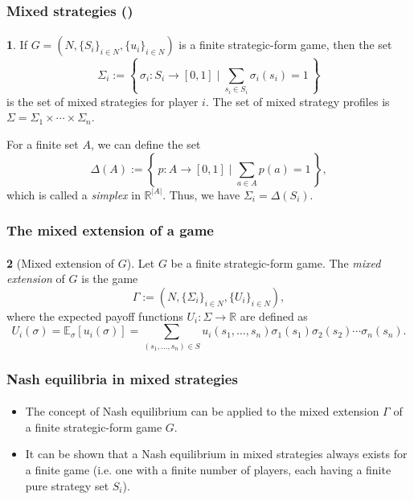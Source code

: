 \documentclass[10pt]{beamer}
\theoremstyle{definition}
\newtheorem{definition}{\translate{Definition}}
\begin{document}
\begin{frame}[fragile]
\frametitle{Mixed strategies ()}
\framesubtitle{}
\begin{definition}
If $ G = (N,\{S_i\}_{i \in N}, \{u_i\}_{i \in N}) $ is a finite strategic-form game, then the set \begin{equation}
\Sigma_i := \left\{\, \sigma_i: S_i \rightarrow [0,1] \mid \sum_{s_i \in S_i}\sigma_i(s_i) = 1  \,\right\}
\label{eq:MixedStrSet}
\end{equation}
is the set of mixed strategies for player $ i $. The set of mixed strategy profiles is $ \Sigma = \Sigma_1 \times \cdots \times \Sigma_n $.
\label{def:MixedStr}
\end{definition}\bigskip

For a finite set $ A $, we can define the set \[ \Delta(A) := \left\{\, p: A \rightarrow [0,1] \mid \sum_{a\in A}p(a) = 1  \,\right\}, \] which is called a \emph{simplex} in $ \mathbb{R}^{|A|} $. Thus, we have $ \Sigma_i = \Delta(S_i) $.
\end{frame}



\begin{frame}[fragile]
\frametitle{The mixed extension of a game}
\framesubtitle{}
\begin{definition}[Mixed extension of $ G $]
Let $ G $ be a finite strategic-form game. The \emph{mixed extension} of $ G $ is the game \begin{equation}
\Gamma := \left(N,\{\Sigma_i\}_{i \in N}, \{U_i\}_{i \in N}\right) ,
\label{eq:MixedExtG}
\end{equation}
where the expected payoff functions $ U_i : \Sigma \rightarrow \mathbb{R} $ are defined as
\begin{equation}
U_i(\sigma) = \mathbb{E}_{\sigma}[u_i(\sigma)] = \sum_{(s_1,\ldots,s_n)\in S}u_i(s_1,\ldots,s_n)\sigma_1(s_1)\sigma_2(s_2)\cdots \sigma_n(s_n).
\label{eq:ExpPayoff}
\end{equation}
\label{def:MixedExtension}
\end{definition}
\end{frame}


\begin{frame}[fragile]
\frametitle{Nash equilibria in mixed strategies}
\framesubtitle{}
\begin{itemize}\itemsep1em
\item The concept of Nash equilibrium can be applied to the mixed extension $ \Gamma $ of a finite strategic-form game $ G $.
\item It can be shown that a Nash equilibrium in mixed strategies always exists for a finite game (i.e. one with a finite number of players, each having a finite pure strategy set $ S_i $).
\end{itemize}
\end{frame}
\end{document}
